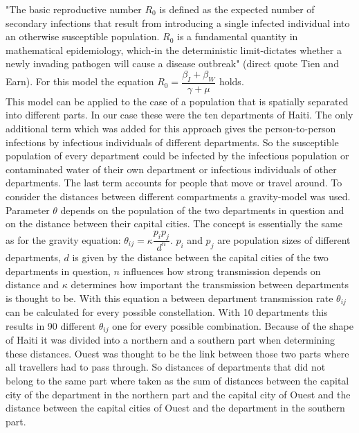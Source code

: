 \documentclass[11pt]{article}
\begin{document}
"The basic reproductive number $ R_{0} $ is defined as the expected number of secondary infections that result from introducing a single infected individual into an otherwise susceptible population. $ R_{0} $ is a fundamental quantity in mathematical epidemiology, which-in the deterministic limit-dictates whether a newly invading pathogen will cause a disease outbreak" (direct quote Tien and Earn). For this model the equation $ R_{0}=\dfrac{\beta_{I}+\beta_{W}}{\gamma+\mu} $ holds.\\
This model can be applied to the case of a population  that is spatially separated into different parts. In our case these were the ten departments of Haiti. The only additional term which was added for this approach gives the person-to-person infections by infectious individuals of different departments. So the susceptible population of every department could be infected by the infectious population or contaminated water of their own department or infectious individuals of other departments. 
\newline The last term accounts for people that move or travel around. To consider the distances between different compartments a gravity-model was used. Parameter $ \theta $ depends on the population of the two departments in question and on the distance between their capital cities. The concept is essentially the same as for the gravity equation: $ \theta_{ij}=\kappa\dfrac{p_{i}p_{j}}{d^{n}} $. $ p_{i} $ and $ p_{j} $ are population sizes of different departments, $ d $ is given by the distance between the capital cities of the two departments in question, $ n $ influences how strong transmission depends on distance and $ \kappa $ determines how important the transmission between departments is thought to be. With this equation a between department transmission rate $ \theta_{ij} $ can be calculated for every possible constellation. With 10 departments this results in 90 different $ \theta_{ij} $ one for every possible combination. 
\newline Because of the shape of Haiti it was divided into a northern and a southern part when determining these distances. Ouest was thought to be the link between those two parts where all travellers had to pass through. So distances of departments that did not belong to the same part where taken as the sum of distances between the capital city of the department in the northern part and the capital city of Ouest and the distance between the capital cities of Ouest and the department in the southern part.\\
\end{document}
